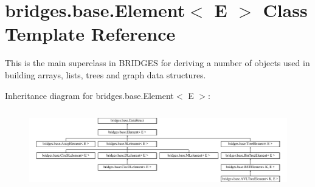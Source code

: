 \hypertarget{classbridges_1_1base_1_1_element}{}\section{bridges.\+base.\+Element$<$ E $>$ Class Template Reference}
\label{classbridges_1_1base_1_1_element}


This is the main superclass in B\+R\+I\+D\+G\+ES for deriving a number of objects used in building arrays, lists, trees and graph data structures.  


Inheritance diagram for bridges.\+base.\+Element$<$ E $>$\+:\begin{figure}[H]
\begin{center}
\leavevmode
\includegraphics[height=3.485477cm]{classbridges_1_1base_1_1_element}
\end{center}
\end{figure}
